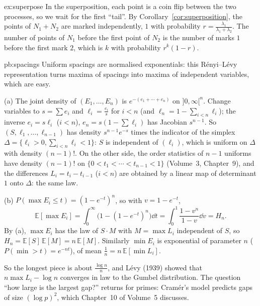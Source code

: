 \begin{solution}{ex:superpose}
\idea In the superposition, each point is a coin flip between the two processes, so we wait for the first ``tail''.
\writeup By Corollary~\ref{cor:superposition}, the points of $N_1+N_2$ are marked independently, $1$ with probability $r=\frac{\lambda_1}{\lambda_1+\lambda_2}$. The number of points of $N_1$ before
the first point of $N_2$ is the number of marks $1$ before the first mark $2$, which is $k$ with probability $r^k(1-r)$.
\end{solution}

\begin{solution}{pb:spacings}
\idea Uniform spacings are normalised exponentials: this Rényi--Lévy representation turns maxima of spacings into maxima of independent
variables, which are easy.

\writeup (a) The joint density of $(E_1,\dots,E_n)$ is $e^{-(e_1+\cdots+e_n)}$ on $]0,\infty[^n$. Change variables to $s=\sum e_i$ and $\ell_i=\frac{e_i}s$ for $i<n$
(and $\ell_n=1-\sum_{i<n}\ell_i$); the inverse $e_i=s\ell_i$ ($i<n$), $e_n=s(1-\sum\ell_i)$ has Jacobian $s^{n-1}$. So $(S,\ell_1,\dots,\ell_{n-1})$ has density
$s^{n-1}e^{-s}$ times the indicator of the simplex $\Delta=\{\ell_i>0,\sum_{i<n}\ell_i<1\}$: $S$ is independent of $(\ell_i)$, which is uniform on $\Delta$ with
density $(n-1)!$. On the other side, the order statistics of $n-1$ uniforms have density $(n-1)!$ on $\{0<t_1<\cdots<t_{n-1}<1\}$ (Volume~3, Chapter~9), and
the differences $L_i=t_i-t_{i-1}$ ($i<n$) are obtained by a linear map of determinant $1$ onto $\Delta$: the same law.

(b) $P(\max E_i\le t)=(1-e^{-t})^n$, so with $v=1-e^{-t}$,
\[
\mathbb E[\max E_i]=\int_0^\infty\bigl(1-(1-e^{-t})^n\bigr)\dd t=\int_0^1\frac{1-v^n}{1-v}\dd v=H_n.
\]
By (a), $\max E_i$ has the law of $S\cdot M$ with $M=\max L_i$ independent of $S$, so $H_n=\mathbb E[S]\,\mathbb E[M]=n\,\mathbb E[M]$. Similarly $\min E_i$ is
exponential of parameter $n$ ($P(\min>t)=e^{-nt}$), of mean $\frac1n=n\,\mathbb E[\min L_i]$.

\leads So the longest piece is about $\frac{\log n}n$, and Lévy (1939) showed that $n\max L_i-\log n$ converges in law to the Gumbel distribution.
The question ``how large is the largest gap?'' returns for primes: Cramér's model predicts gaps of size $(\log p)^2$, which Chapter~10 of
Volume~5 discusses.
\end{solution}


